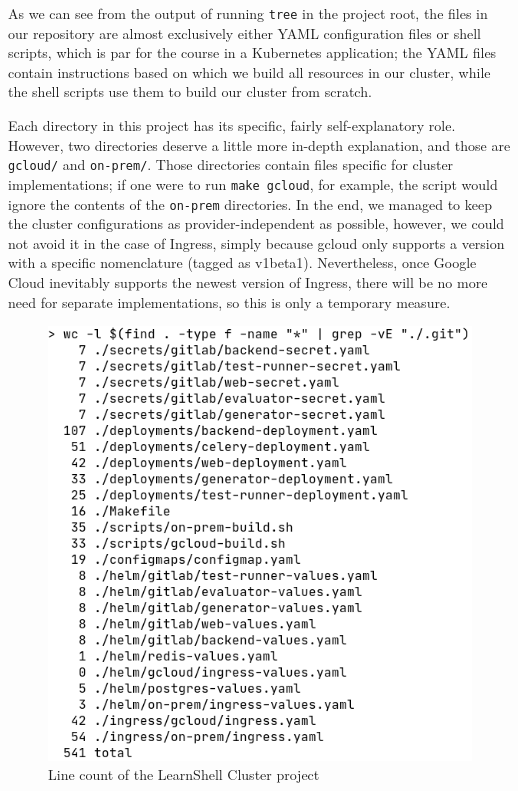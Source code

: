 \documentclass[thesis=B,english]{FITthesis}[2019/12/23]
\begin{document}
As we can see from the output of running \verb|tree| in the project root, the files in our repository are almost exclusively either YAML configuration files or shell scripts, which is par for the course in a Kubernetes application; the YAML files contain instructions based on which we build all resources in our cluster, while the shell scripts use them to build our cluster from scratch.

Each directory in this project has its specific, fairly self-explanatory role. However, two directories deserve a little more in-depth explanation, and those are \verb|gcloud/| and \verb|on-prem/|. Those directories contain files specific for cluster implementations; if one were to run \verb|make gcloud|, for example, the script would ignore the contents of the \verb|on-prem| directories. In the end, we managed to keep the cluster configurations as provider-independent as possible, however, we could not avoid it in the case of Ingress, simply because gcloud only supports a version with a specific nomenclature (tagged as v1beta1). Nevertheless, once Google Cloud inevitably supports the newest version of Ingress, there will be no more need for separate implementations, so this is only a temporary measure.

\begin{figure}[H]
\caption{Line count of the LearnShell Cluster project}
\includegraphics[scale=0.5]{line-count}
\end{figure}
\end{document}
